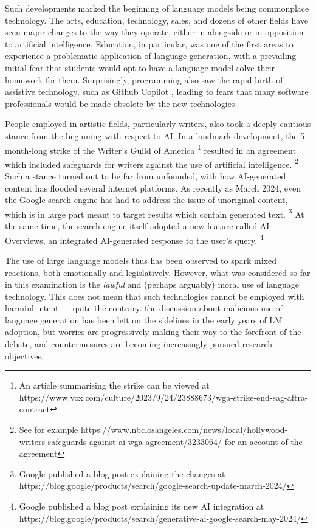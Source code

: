 Such developments marked the beginning of language models being commonplace technology.
The arts, education, technology, sales, and dozens of other fields have seen major changes to the way they operate, either in alongside or in opposition to artificial intelligence.
Education, in particular, was one of the first areas to experience a problematic application of language generation, with a prevailing initial fear that students would opt to have a language model solve their homework for them.
Surprisingly, programming also saw the rapid birth of assistive technology, such as Github Copilot \citep{chen2021evaluatinglargelanguagemodels}, leading to fears that many software professionals would be made obsolete by the new technologies.

People employed in artistic fields, particularly writers, also took a deeply cautious stance from the beginning with respect to AI.
In a landmark development, the 5-month-long strike of the Writer's Guild of America
\footnote{An article summarising the strike can be viewed at https://www.vox.com/culture/2023/9/24/23888673/wga-strike-end-sag-aftra-contract}
resulted in an agreement which included safeguards for writers against the use of artificial intelligence.
\footnote{See for example https://www.nbclosangeles.com/news/local/hollywood-writers-safeguards-against-ai-wga-agreement/3233064/ for an account of the agreement}
Such a stance turned out to be far from unfounded, with how AI-generated content has flooded several internet platforms.
As recently as March 2024, even the Google search engine has had to address the issue of unoriginal content, which is in large part meant to target results which contain generated text.
\footnote{Google published a blog post explaining the changes at https://blog.google/products/search/google-search-update-march-2024/}
At the same time, the search engine itself adopted a new feature called AI Overviews, an integrated AI-generated response to the user's query.
\footnote{Google published a blog post explaining its new AI integration at https://blog.google/products/search/generative-ai-google-search-may-2024/}

The use of large language models thus has been observed to spark mixed reactions, both emotionally and legislatively. However, what was considered so far in this examination is the \emph{lawful} and (perhaps arguably) moral use of language technology.
This does not mean that such technologies cannot be employed with harmful intent --- quite the contrary. the discussion about malicious use of language generation has been left on the sidelines in the early years of LM adoption, but worries are progressively making their way to the forefront of the debate, and countermesures are becoming increasingly pursued research objectives.